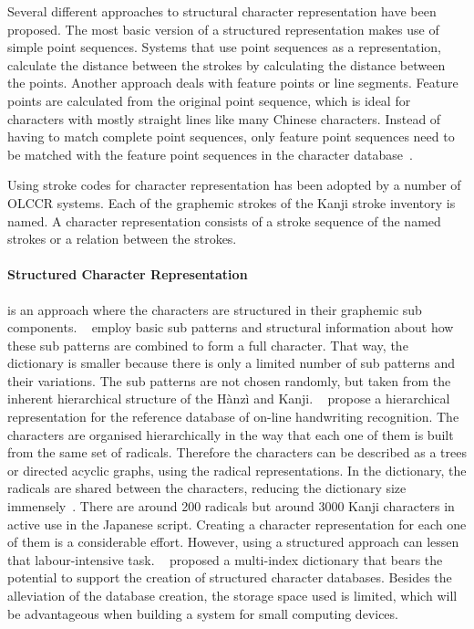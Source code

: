 Several different approaches to structural character representation have been
proposed. The most basic version of a structured representation makes use of 
simple point sequences. Systems that use point sequences as a representation,
calculate the distance between the strokes by calculating the distance
between the points. Another approach deals with feature points or line segments. 
Feature points are calculated from the original point sequence, 
which is ideal for characters with mostly straight lines like many 
Chinese characters. Instead of having to match complete point sequences, 
only feature point sequences need to be matched with the feature point
sequences in the character database~.

Using stroke codes for character representation has been adopted by a number of
OLCCR systems. Each of the graphemic strokes of the Kanji stroke inventory is
named. A character representation consists of a stroke sequence of the named
strokes or a relation between the strokes.

\paragraph{Structured Character Representation} 
is an approach where the characters are structured in their graphemic 
sub components. ~\citeyear{Nakagawa2008} employ basic 
sub patterns and structural information about how these sub patterns are combined 
to form a full character.
That way, the dictionary is smaller because there is only a limited number of 
sub patterns and their variations. The sub patterns are not chosen randomly,
but taken from the inherent hierarchical structure of the Hànzì and Kanji.
~\citeyear{ChenLee1996} propose a hierarchical 
representation for the reference database of on-line handwriting recognition.
The characters are organised hierarchically in the way that each one of them
is built from the same set of radicals. Therefore the characters can be 
described as a trees or directed acyclic graphs, using the radical 
representations. In the dictionary, the radicals are shared between the 
characters, reducing the dictionary size 
immensely~. 
There are around 200 radicals but around 3000 Kanji characters in active use in 
the Japanese script. Creating a character representation for each one of them 
is a considerable effort. However, using a structured approach can lessen that 
labour-intensive task. ~\citeyear{Breen2004} proposed 
a multi-index dictionary that bears the potential to support the creation of 
structured character databases. Besides the alleviation of the database creation,
the storage space used is limited, which will be advantageous when building a 
system for small computing devices.


